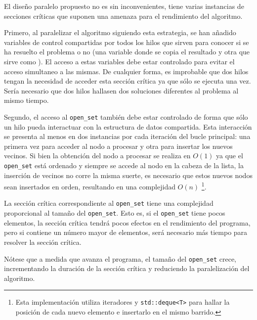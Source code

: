 El diseño paralelo propuesto no es sin inconvenientes,
tiene varias instancias de secciones críticas que suponen
una amenaza para el rendimiento del algoritmo.

Primero, al paralelizar el algoritmo siguiendo esta estrategia,
se han añadido variables de control compartidas por todos
los hilos que sirven para conocer si se ha resuelto el problema
o no (una variable donde se copia el resultado y
otra que sirve como ).
El acceso a estas variables debe estar controlado
para evitar el acceso simultaneo a las mismas.
De cualquier forma, es improbable que dos hilos tengan
la necesidad de acceder esta sección crítica ya que sólo
se ejecuta una vez.
Sería necesario que dos hilos hallasen dos soluciones diferentes al
problema al mismo tiempo.

Segundo, el acceso al \lstinline{open_set} también 
debe estar controlado de forma que sólo un hilo
pueda interactuar con la estructura de datos compartida.
Esta interacción se presenta al menos en dos instancias por
cada iteración del bucle principal:
una primera vez para acceder al nodo a procesar
y otra para insertar los nuevos vecinos.
Si bien la obtención del nodo a procesar se realiza en $O(1)$
ya que el \lstinline{open_set} está ordenado y
siempre se accede al nodo en la cabeza de la lista,
la inserción de vecinos no corre la misma suerte,
es necesario que estos nuevos nodos sean insertados en orden,
resultando en una complejidad $O(n)$
\footnote{Esta implementación utiliza iteradores y
\lstinline{std::deque<T>} para hallar la posición de cada
nuevo elemento e insertarlo en el mismo barrido.}.

\begin{notebox}
    La sección crítica correspondiente al \lstinline{open_set}
    tiene una complejidad proporcional al tamaño del \lstinline{open_set}.
    Esto es, si el \lstinline{open_set} tiene pocos elementos,
    la sección crítica tendrá pocos efectos en el rendimiento del programa,
    pero si contiene un número mayor de elementos,
    será necesario más tiempo para resolver la sección crítica.

    Nótese que a medida que avanza el programa,
    el tamaño del \lstinline{open_set} crece,
    incrementando la duración de la sección crítica y
    reduciendo la paralelización del algoritmo. 
\end{notebox}

